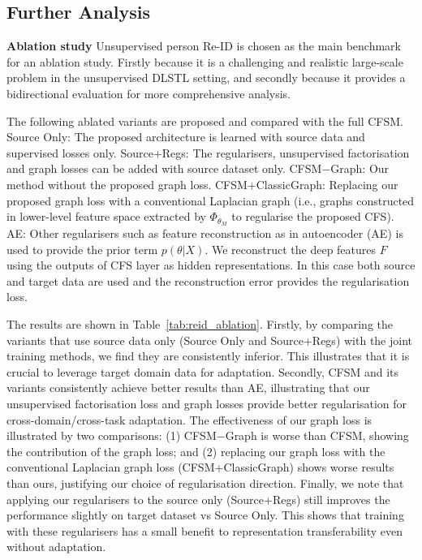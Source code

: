 \documentclass[letterpaper]{article} \usepackage{aaai19}  \usepackage{times}  \usepackage{helvet}  \usepackage{courier}  \usepackage{url}  \usepackage{graphicx}
\newcommand{\keypoint}[1]{\noindent\textbf{#1}\quad}
\begin{document}
\subsection{Further Analysis}
\keypoint{Ablation study}  Unsupervised person Re-ID is chosen as the main benchmark for an ablation study. Firstly because it is a challenging and realistic large-scale problem in the unsupervised DLSTL setting, and secondly because it provides a bidirectional evaluation for more comprehensive analysis.


The following ablated variants are proposed and compared with the full CFSM. Source Only: The proposed architecture is learned with source data and supervised losses only. Source+Regs: The regularisers, unsupervised factorisation and graph losses can be added with source dataset only. CFSM$-$Graph: Our method without the proposed graph loss. CFSM+ClassicGraph: Replacing our proposed graph loss with a conventional Laplacian graph (i.e., graphs constructed in lower-level feature space extracted by $\Phi_{\theta_M}$ to regularise the proposed CFS). AE: Other regularisers such as feature reconstruction as in autoencoder (AE) is used to provide the prior term $p(\theta|X)$. We reconstruct the deep features $F$  using the outputs of CFS layer as hidden representations. In this case both source and target data are used and the reconstruction error provides the regularisation loss. 

The results are shown in Table~\ref{tab:reid_ablation}. Firstly, by comparing the variants that use source data only (Source Only and Source+Regs) with the joint training methods, we find they are consistently inferior. This illustrates that it is crucial to leverage target domain data for adaptation. 
Secondly, CFSM and its variants consistently achieve better results than AE, illustrating that our unsupervised factorisation loss and graph losses provide better regularisation for cross-domain/cross-task adaptation. The effectiveness of our graph loss is illustrated by two comparisons: (1) CFSM$-$Graph is worse than CFSM, showing the contribution of the graph loss; and (2) replacing our graph loss with the conventional Laplacian graph loss (CFSM+ClassicGraph) shows worse results than ours, justifying our choice of regularisation direction.
Finally, we note that applying our regularisers to the source only (Source+Regs) still improves the performance slightly on target dataset vs Source Only. This shows that training with these regularisers has a small benefit to representation transferability even without adaptation.
\end{document}
